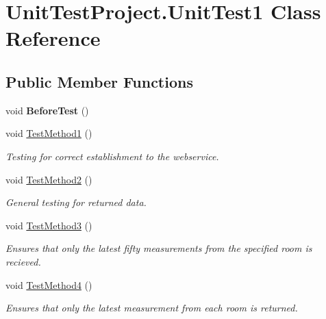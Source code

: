 \hypertarget{class_unit_test_project_1_1_unit_test1}{}\section{Unit\+Test\+Project.\+Unit\+Test1 Class Reference}
\label{class_unit_test_project_1_1_unit_test1}
\subsection*{Public Member Functions}
\begin{DoxyCompactItemize}
\item 
\hypertarget{class_unit_test_project_1_1_unit_test1_ab87062c224ecd85ba0ede42ffd498947}{}void {\bfseries Before\+Test} ()\label{class_unit_test_project_1_1_unit_test1_ab87062c224ecd85ba0ede42ffd498947}

\item 
void \hyperlink{class_unit_test_project_1_1_unit_test1_a1cd53bf019a6a5ac0422147c8b1434da}{Test\+Method1} ()
\begin{DoxyCompactList}\small\item\em Testing for correct establishment to the webservice. \end{DoxyCompactList}\item 
void \hyperlink{class_unit_test_project_1_1_unit_test1_a1373f370b6cb23adfeb8d9a1a657c6e4}{Test\+Method2} ()
\begin{DoxyCompactList}\small\item\em General testing for returned data. \end{DoxyCompactList}\item 
void \hyperlink{class_unit_test_project_1_1_unit_test1_a69ca887cbb3445ecebccc5f352084025}{Test\+Method3} ()
\begin{DoxyCompactList}\small\item\em Ensures that only the latest fifty measurements from the specified room is recieved. \end{DoxyCompactList}\item 
void \hyperlink{class_unit_test_project_1_1_unit_test1_a437ee4d7c6e736155400a52f16340204}{Test\+Method4} ()
\begin{DoxyCompactList}\small\item\em Ensures that only the latest measurement from each room is returned. \end{DoxyCompactList}\end{DoxyCompactItemize}


